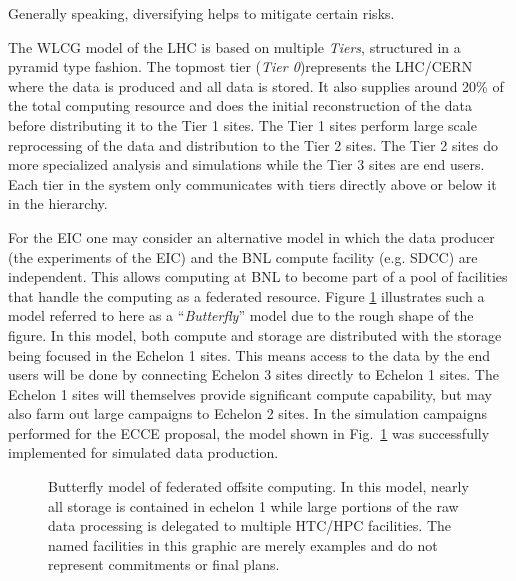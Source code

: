 Generally speaking, diversifying helps to mitigate certain risks. 

The WLCG model of the LHC is based on multiple \emph{Tiers}, structured in a pyramid type fashion. The topmost tier (\emph{Tier 0})represents the LHC/CERN where the data is produced and all data is stored. It also supplies around 20\% of the total computing resource and does the initial reconstruction of the data before distributing it to the Tier 1 sites\cite{WLCG_Tiers_website}. The Tier 1 sites perform large scale reprocessing of the data and distribution to the Tier 2 sites. The Tier 2 sites do more specialized analysis and simulations while the Tier 3 sites are end users. Each tier in the system only communicates with tiers directly above or below it in the hierarchy.

For the EIC one may consider an alternative model in which the data producer (the experiments of the EIC) and the BNL compute facility (e.g. SDCC) are independent. This allows computing at BNL to become part of a pool of facilities that handle the computing as a federated resource. Figure \ref{fig:federated_offsite_butterfly} illustrates such a model referred to here as a ``\emph{Butterfly}'' model due to the rough shape of the figure. In this model, both compute and storage are distributed with the storage being focused in the Echelon 1 sites. This means access to the data by the end users will be done by connecting Echelon 3 sites directly to Echelon 1 sites. The Echelon 1 sites will themselves provide significant compute capability, but may also farm out large campaigns to Echelon 2 sites. In the simulation campaigns performed for the ECCE proposal, the model shown in Fig.~\ref{fig:federated_offsite_butterfly} was successfully implemented for simulated data production.

\begin{figure}[hbt!]
 \begin{center}
  \caption[Federated Computing Butterfly model.]{\label{fig:federated_offsite_butterfly} Butterfly model of federated offsite computing. In this model, nearly all storage is contained in echelon 1 while large portions of the raw data processing is delegated to multiple HTC/HPC facilities. The named facilities in this graphic are merely examples and do not represent commitments or final plans.}
 \end{center}
\end{figure}

